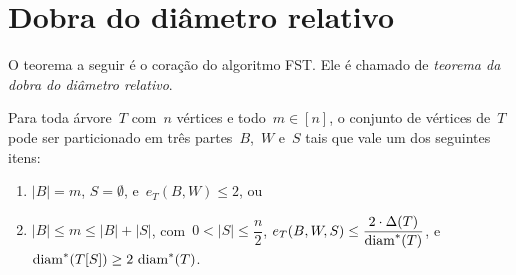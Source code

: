 \section {Dobra do diâmetro relativo}
\label{sec:dobraDiametro}
	O teorema a seguir é o coração do algoritmo FST.
	Ele é chamado de \textit{teorema da dobra do diâmetro relativo}.	
		\begin{teo}
		\label{teo:dobraDiametro}
			Para toda árvore~$T$ com~$n$ vértices e 
			todo~${m\in [n]}$,
			o conjunto de vértices de~$T$ pode ser particionado em 
			três partes~$B$,~$W$ e~$S$ tais que vale um dos 
			seguintes itens:
			\begin{enumerate}
				\item ${|B|=m}$, ${S=\emptyset}$, e~${e_T(B,W)\le 2}$, ou
				\item ${|B|\le m\le |B|+|S|}$, 
				com~${0<|S|\le\dfrac{n}{2}}$,
				${e_T(B,W,S)\le \dfrac{2\cdot 
				\Delta(T)}{\mathrm{diam}^*(T)}}$, 
				e~${\mathrm{diam}^*(T[S])\ge 2\ \mathrm{diam}^*(T)}$.
			\end{enumerate}
		\end{teo}

	\bigskip
	\bigskip



